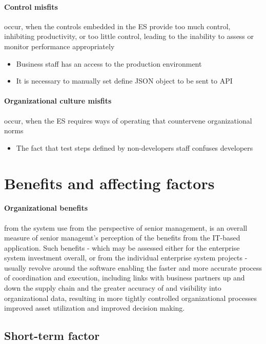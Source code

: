 \paragraph{Control misfits} occur, when the controls embedded in the ES provide too much control, inhibiting productivity, or too little control, leading to the inability to assess or monitor performance appropriately 
\begin{itemize}
		\item Business staff has an access to the production environment 
		\item It is necessary to manually set define JSON object to be sent to API
\end{itemize}


\paragraph{Organizational culture misfits}  occur, when the ES requires ways of operating that countervene organizational norms 
\begin{itemize}
	\item The fact that test steps defined by non-developers staff confuses developers
\end{itemize}


\section{Benefits and affecting factors}
\paragraph{Organizational benefits} from the system use from the perspective of senior management, is an overall measure of senior managemt's perception of the benefits from the IT-based application. Such benefits - which may be assessed either for the enterprise system investment overall, or from the individual enterprise system projects - usually revolve around the software enabling the faster and more accurate process of coordination and execution, including links with business partners up and down the supply chain and the greater accuracy of and visibility into organizational data, resulting in more tightly controlled organizational processes improved asset utilization and improved decision making.

\subsection{Short-term factor}
